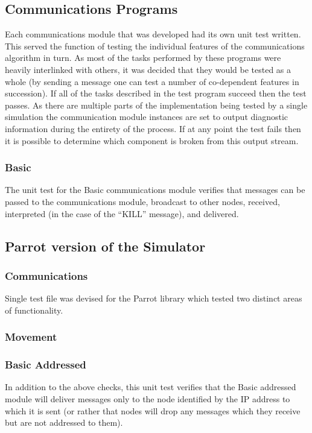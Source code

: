 \subsection{Communications Programs}
Each communications module that was developed had its own unit test written. This served the function of testing the individual features of the communications algorithm in turn. As most of the tasks performed by these programs were heavily interlinked with others, it was decided that they would be tested as a whole (by sending a message one can test a number of co-dependent features in succession). If all of the tasks described in the test program succeed then the test passes. As there are multiple parts of the implementation being tested by a single simulation the communication module instances are set to output diagnostic information during the entirety of the process. If at any point the test fails then it is possible to determine which component is broken from this output stream.

\subsubsection{Basic}
The unit test for the Basic communications module verifies that messages can be passed to the communications module, broadcast to other nodes, received, interpreted (in the case of the ``KILL'' message), and delivered.

\subsection{Parrot version of the Simulator}

\subsubsection{Communications}
Single test file was devised for the Parrot library which tested two distinct areas of functionality.

\subsubsection{Movement}

\subsubsection{Basic Addressed}
In addition to the above checks, this unit test verifies that the Basic addressed module will deliver messages only to the node identified by the IP address to which it is sent (or rather that nodes will drop any messages which they receive but are not addressed to them).

